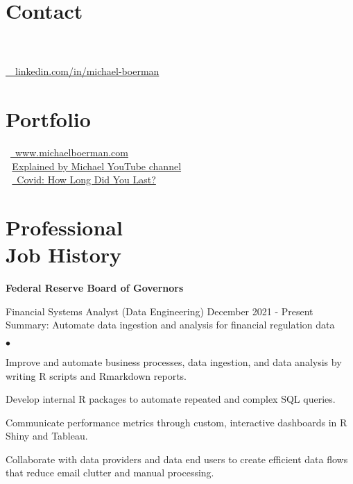 \documentclass[margin, line]{res}
\newenvironment{list2}{
  \begin{list}{$\bullet$}{%
      \setlength{\itemsep}{0.04in}
      \setlength{\parsep}{0in} \setlength{\parskip}{0in}
      \setlength{\topsep}{0.05in} \setlength{\partopsep}{0in} 
      \setlength{\leftmargin}{\dimexpr 26pt-0.05in}}}
    {\end{list}}
\begin{document}
\address{Detail-oriented data scientist with M.S. + 2 years' experience driving decisions by modeling economic and financial data.}
\begin{resume}

\vspace{-1mm}
\section{\sc Contact}

 \\
 \\
\faLinkedinIn  \href{https://www.linkedin.com/in/michael-boerman}{\ttfamily \, \, linkedin.com/in/michael-boerman}\\
\vspace{-.65cm}


\section{\sc Portfolio}
\faBriefcase \, \href{https://www.michaelboerman.com/}{\ttfamily  \, www.michaelboerman.com}\\
 \,\, \href{https://www.youtube.com/channel/UCxFMrMb6PrS7SOrQi-BfMUw/videos?view=0&sort=p&flow=grid}{ Explained by Michael YouTube channel}\\
\faChartLine \,\, \href{https://michaelboerman.shinyapps.io/covid_percentiles/}{\, Covid: How Long Did You Last?}\\
\vspace{-.35cm}


\section{\sc Professional \\ Job History }
{\bf Federal Reserve Board of Governors}\\

\vspace{-.65cm}

Financial Systems Analyst (Data Engineering) \hfill December 2021 - Present\\
\hspace*{3mm} 
    Summary: Automate data ingestion and analysis for financial regulation data
\hspace*{3mm}
    \begin{list2}
        \item Improve and automate business processes, data ingestion, and data analysis by writing R scripts and Rmarkdown reports.
        \item Develop internal R packages to automate repeated and complex SQL queries.
        \item Communicate performance metrics through custom, interactive dashboards in R Shiny and Tableau.
        \item Collaborate with data providers and data end users to create efficient data flows that reduce email clutter and manual processing.
    \end{list2}



\end{resume}
\end{document}
